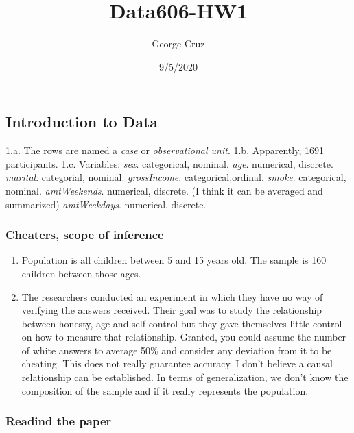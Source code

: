 \documentclass[
]{article}
\title{Data606-HW1}
\author{George Cruz}
\date{9/5/2020}
\providecommand{\tightlist}{%
  \setlength{\itemsep}{0pt}\setlength{\parskip}{0pt}}
\begin{document}
\maketitle

\hypertarget{introduction-to-data}{%
\subsection{Introduction to Data}\label{introduction-to-data}}

1.a. The rows are named a \emph{case} or \emph{observational unit}. 1.b.
Apparently, 1691 participants. 1.c. Variables: \emph{sex}. categorical,
nominal. \emph{age}. numerical, discrete. \emph{marital}. categorial,
nominal. \emph{grossIncome}. categorical,ordinal. \emph{smoke}.
categorical, nominal. \emph{amtWeekends}. numerical, discrete. (I think
it can be averaged and summarized) \emph{amtWeekdays}. numerical,
discrete.

\hypertarget{cheaters-scope-of-inference}{%
\subsubsection{Cheaters, scope of
inference}\label{cheaters-scope-of-inference}}

\begin{enumerate}
\def\labelenumi{(\alph{enumi})}
\tightlist
\item
  Population is all children between 5 and 15 years old. The sample is
  160 children between those ages.
\item
  The researchers conducted an experiment in which they have no way of
  verifying the answers received. Their goal was to study the
  relationship between honesty, age and self-control but they gave
  themselves little control on how to measure that relationship.
  Granted, you could assume the number of white answers to average 50\%
  and consider any deviation from it to be cheating. This does not
  really guarantee accuracy. I don't believe a causal relationship can
  be established. In terms of generalization, we don't know the
  composition of the sample and if it really represents the population.
\end{enumerate}

\hypertarget{readind-the-paper}{%
\subsubsection{Readind the paper}\label{readind-the-paper}}
\end{document}
